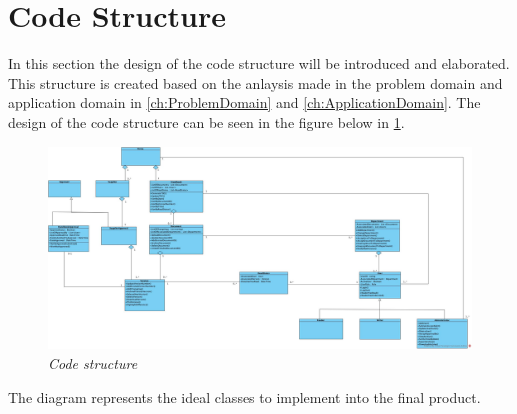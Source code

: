 \section{Code Structure} \label{sec:codestructure}

In this section the design of the code structure will be introduced and elaborated.
This structure is created based on the anlaysis made in the problem domain and application domain in \cref{ch:ProblemDomain} and \ref{ch:ApplicationDomain}.
The design of the code structure can be seen in the figure below in \cref{fig:codestructure}.

\begin{figure}[H]
	\centering
	\includegraphics[width=1.2\textwidth]{billeder/codestructure.jpg}
	\caption{\textit{Code structure
	}\label{fig:codestructure}}
\end{figure}

The diagram represents the ideal classes to implement into the final product.
